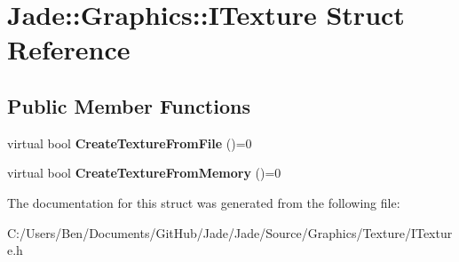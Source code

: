 \hypertarget{struct_jade_1_1_graphics_1_1_i_texture}{}\section{Jade\+:\+:Graphics\+:\+:I\+Texture Struct Reference}
\label{struct_jade_1_1_graphics_1_1_i_texture}
\subsection*{Public Member Functions}
\begin{DoxyCompactItemize}
\item 
\hypertarget{struct_jade_1_1_graphics_1_1_i_texture_af55656b5b19dc7c930498cd657e5a71f}{}virtual bool {\bfseries Create\+Texture\+From\+File} ()=0\label{struct_jade_1_1_graphics_1_1_i_texture_af55656b5b19dc7c930498cd657e5a71f}

\item 
\hypertarget{struct_jade_1_1_graphics_1_1_i_texture_a5f13651306a080d172402bf3c3816467}{}virtual bool {\bfseries Create\+Texture\+From\+Memory} ()=0\label{struct_jade_1_1_graphics_1_1_i_texture_a5f13651306a080d172402bf3c3816467}

\end{DoxyCompactItemize}


The documentation for this struct was generated from the following file\+:\begin{DoxyCompactItemize}
\item 
C\+:/\+Users/\+Ben/\+Documents/\+Git\+Hub/\+Jade/\+Jade/\+Source/\+Graphics/\+Texture/I\+Texture.\+h\end{DoxyCompactItemize}
